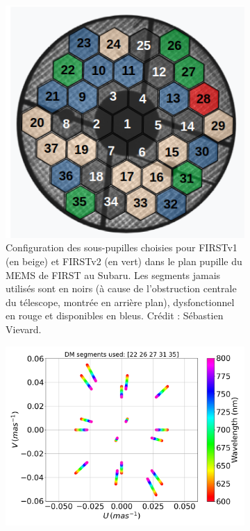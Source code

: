 \begin{figure}[ht!]
    \centering
    \begin{subfigure}[t]{0.43\textwidth}
        \centering
        \includegraphics[width=\textwidth]{Figure_Chap5/BaselineMap_Subaru_V1_V2_20221010.png}
        \caption{Configuration des sous-pupilles choisies pour FIRSTv1 (en beige) et FIRSTv2 (en vert) dans le plan pupille du MEMS de FIRST au Subaru. Les segments jamais utilisés sont en noirs (à cause de l'obstruction centrale du télescope, montrée en arrière plan), dysfonctionnel en rouge et disponibles en bleus. Crédit : Sébastien Vievard.}
        \label{fig:SegUVSubaruA}
    \end{subfigure}\hfill
    \begin{subfigure}[t]{0.55\textwidth}
        \centering
        \includegraphics[width=\textwidth]{Figure_Chap5/UVplane_Subaru_22_26_27_31_35.png}

\end{subfigure}
\end{figure}

